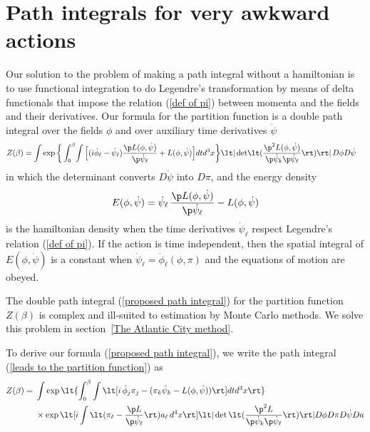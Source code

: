 \documentclass[prd,preprint,floatfix,showpacs]{revtex4-1}
\begin{document}
\section {Path integrals for very awkward actions
\label {Path integrals for very awkward actions} }

\par
Our solution to the problem
of making a path integral without a
hamiltonian is to use
functional integration to do Legendre's 
transformation by means of
delta functionals that
impose the relation (\ref {def of pi})
between momenta and 
the fields and their derivatives.
Our formula for the partition function 
is a double path integral over the fields \( \phi \)
and over auxiliary time derivatives \( \dot \psi \)
\begin{equation}
   \begin{split}
Z(\beta) = {}&
\! \int \exp \bigg\{ \int_0^\beta \! \int 
\Big[ ( i \dot \phi_\ell
- \dot \psi_\ell ) \frac{ \p  L(\phi, \dot \psi) }
{ \p \dot \psi_\ell }
+ L(\phi, \dot \psi) 
\Big] dt d^3x \bigg\}  \lt| \det \! 
\lt( \frac{ \p^2  L(\phi, \dot \psi) }
{ \p \dot \psi_k \p \dot \psi_\ell }  \rt) \rt|
\, D\phi D\dot\psi 
\label {proposed path integral}
   \end{split}
\end{equation}
in which the determinant converts 
\( D\dot \psi \) into \( D\pi \),
and the energy density
\begin{equation}
E(\phi, \dot \psi) = {}
\dot \psi_\ell \, \frac{ \p  L(\phi, \dot \psi) }
{ \p \dot \psi_\ell }
- L(\phi, \dot \psi) 
\label {pseudo-hamiltonian}
\end{equation}
is the hamiltonian density when
the time derivatives
\( \dot \psi_\ell  \) 
respect Legendre's relation (\ref {def of pi})\@.
If the action is time independent, then
the spatial integral of \( E(\phi, \dot \psi) \)
is a constant when 
\( \dot \psi_\ell = \dot \phi_\ell (\phi, \pi) \) and
the equations of motion are obeyed.
\par
The double path integral (\ref {proposed path integral})
for the partition function \( Z(\beta) \) is 
complex and ill-suited to estimation
by Monte Carlo methods.
We solve this problem in 
section~\ref {The Atlantic City method}\@.
\par
To derive our formula (\ref {proposed path integral}),
we write the path integral 
(\ref {leads to the partition function}) as
\begin{equation}
   \begin{split}
Z(\beta) = {}&
\int \exp \lt\{ \int_0^\beta \int \lt[ i \, \dot \phi_j \pi_j 
- ( \pi_k \dot \psi_k - L(\phi, \dot \psi) )
\rt] dt d^3x \rt\} \\
{}& \times \exp \lt[ i \int \lt( \pi_\ell 
- \frac{ \p  L }{ \p \dot \psi_\ell } \rt)
a_\ell \, d^4x \rt] 
\lt| \det \lt( \frac{ \p^2  L }
 { \p \dot \psi_k \p \dot \psi_\ell }  \rt) \rt| 
D\phi D\pi D\dot\psi Da 
\label {quartic path integral}
   \end{split}
\end{equation}
\end{document}
